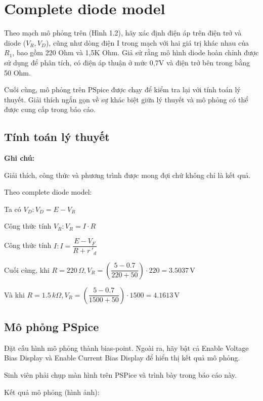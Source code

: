 \section{Complete diode model}

Theo mạch mô phỏng trên (Hình 1.2), hãy xác định điện áp trên điện trở và diode ($V_R, V_D$), cũng như dòng điện I trong mạch với hai giá trị khác nhau của $R_1$, bao gồm 220 Ohm và 1,5K Ohm. Giả sử rằng mô hình diode hoàn chỉnh được sử dụng để phân tích, có điện áp thuận ở mức 0,7V và điện trở bên trong bằng 50 Ohm.

Cuối cùng, mô phỏng trên PSpice được chạy để kiểm tra lại với tính toán lý thuyết. Giải thích ngắn gọn về sự khác biệt giữa lý thuyết và mô phỏng có thể được cung cấp trong báo cáo.

\subsection{Tính toán lý thuyết}

\textbf{Ghi chú:}

Giải thích, công thức và phương trình được mong đợi chứ không chỉ là kết quả.

Theo complete diode model:

Ta có $V_{D} : V_{D} = E - V_{R}$

Công thức tính $V_{R}: V_{R} = I \cdot R$

Công thức tính $I: I = \dfrac{E - V_{F}}{R + r \, ' _d}$

Cuối cùng, khi $R = 220 \, \Omega, V_{R} = \left(\dfrac{5 - 0.7}{220 + 50}\right) \cdot 220 = 3.5037 \, \text{V}$

Và khi $R = 1.5 \, k\Omega, V_{R} = \left(\dfrac{5 - 0.7}{1500 + 50}\right) \cdot 1500 = 4.1613 \, \text{V}$

\subsection{Mô phỏng PSpice}

Đặt cấu hình mô phỏng thành bias-point. Ngoài ra, hãy bật cả Enable Voltage Bias Display và Enable Current Bias Display để hiển thị kết quả mô phỏng.

Sinh viên phải chụp màn hình trên PSPice và trình bày trong báo cáo này.

Kết quả mô phỏng (hình ảnh):

